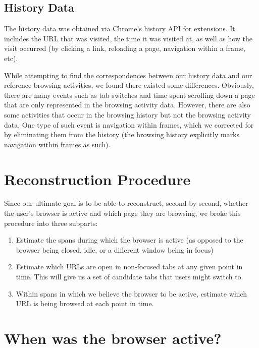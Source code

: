 \documentclass{sigchi}
\begin{document}
\subsection{History Data}

The history data was obtained via Chrome's history API for extensions. It includes the URL that was visited, the time it was visited at, as well as how the visit occurred (by clicking a link, reloading a page, navigation within a frame, etc).

While attempting to find the correspondences between our history data and our reference browsing activities, we found there existed some differences. Obviously, there are many events such as tab switches and time spent scrolling down a page that are only represented in the browsing activity data. However, there are also some activities that occur in the browsing history but not the browsing activity data. One type of such event is navigation within frames, which we corrected for by eliminating them from the history (the browsing history explicitly marks navigation within frames as such). %

\section{Reconstruction Procedure}

Since our ultimate goal is to be able to reconstruct, second-by-second, whether the user's browser is active and which page they are browsing, we broke this procedure into three subparts:

\begin{enumerate}
	\item Estimate the spans during which the browser is active (as opposed to the browser being closed, idle, or a different window being in focus)
	\item Estimate which URLs are open in non-focused tabs at any given point in time. This will give us a set of candidate tabs that users might switch to.
	\item Within spans in which we believe the browser to be active, estimate which URL is being browsed at each point in time.
\end{enumerate}

\section{When was the browser active?}
\end{document}

